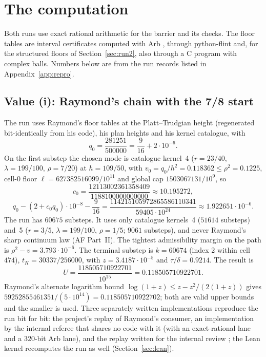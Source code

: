 \documentclass[11pt]{article}
\theoremstyle{definition}
\begin{document}
\section{The computation}\label{sec:computation}

Both runs use exact rational arithmetic for the barrier and its checks. The floor tables
are interval certificates computed with Arb \cite{JohanssonArb17}, through python-flint
\cite{FLINT} and, for the structured floors of Section~\ref{sec:run2}, also through a C
program with complex balls.
Numbers below are from the run records listed in Appendix~\ref{app:repro}.

\subsection{Value (i): Raymond's chain with the 7/8 start}\label{sec:run1}

The run uses Raymond's floor tables at the Platt--Trudgian height (regenerated
bit-identically from his code), his plan heights and his kernel catalogue, with
\[
q_0=\frac{281251}{500000}=\frac9{16}+2\cdot10^{-6}.
\]
On the first substep the chosen mode is catalogue kernel~4 ($r=23/40$, $\lambda=199/100$,
$\rho=7/20$) at $h=109/50$, with $v_0=q_0/h^2=0.118362\le\rho^2=0.1225$, cell-0 floor
$\ell=627382516099/10^{11}$ and global cap $1503067131/10^9$, so
\[
c_0=\frac{12113002361358409}{1188100000000000}\approx10.195272,
\]
\[
q_0-(2+c_0q_0)\cdot10^{-8}-\frac9{16}=\frac{114215105972865586110341}{59405\cdot10^{24}}\approx1.922651\cdot10^{-6}.
\]
The run has $60675$ substeps. It uses only catalogue kernels~4 ($51614$ substeps) and~5
($r=3/5$, $\lambda=199/100$, $\rho=1/5$; $9061$ substeps), and never Raymond's sharp
continuum law (AF Part~II). The tightest admissibility margin on the path is
$\rho^2-v=3.793\cdot10^{-6}$. The terminal substep is $k=60674$ (index $2$ within cell
$474$), $t_K=30337/256000$, with $z=3.4187\cdot10^{-5}$ and $\tau/\delta=0.9214$. The result is
\[
U=\frac{118505710922701}{10^{15}}=0.118505710922701 .
\]
Raymond's alternate logarithm bound $\log(1+z)\le z-z^2/(2(1+z))$ gives
$59252855461351/(5\cdot10^{14})=0.118505710922702$; both are valid upper bounds and the
smaller is used. Three separately written implementations reproduce the run bit for bit: the project's
replay of Raymond's consumer, an implementation by the internal referee that shares no
code with it (with an exact-rational lane and a $320$-bit Arb lane), and the replay written
for the internal review \cite[\S7]{IntReviewB}; the Lean kernel recomputes the run as well
(Section~\ref{sec:lean}).
\end{document}
